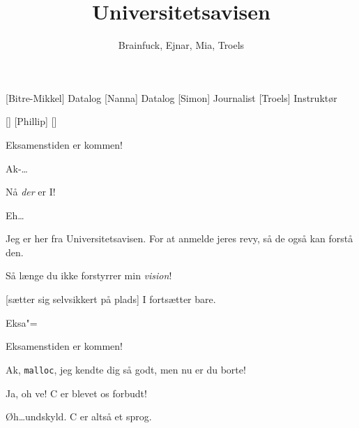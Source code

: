 \documentclass[a4paper,11pt]{article}
\title{Universitetsavisen}
\author{Brainfuck, Ejnar, Mia, Troels}
\begin{document}
\maketitle

\begin{roles}
[Bitre-Mikkel] Datalog
[Nanna] Datalog
[Simon] Journalist
[Troels] Instruktør
\end{roles}

\begin{props}
[]
[Phillip]
[]
\end{props}

\begin{sketch}


 Eksamenstiden er kommen!

 Ak-\ldots


 Nå \emph{der} er I!

 Eh\ldots

 Jeg er her fra Universitetsavisen. For at anmelde jeres revy, så de  også kan forstå den.

 Så længe du ikke forstyrrer min \emph{vision}!

[sætter sig selvsikkert på plads] I fortsætter bare.

 Eksa"=


 Eksamenstiden er kommen!

 Ak, \texttt{malloc}, jeg kendte dig så godt, men nu er du
borte!



 Ja, oh ve!  C er blevet os forbudt!


 Øh\ldots undskyld. C er altså et sprog.


\end{sketch}
\end{document}
